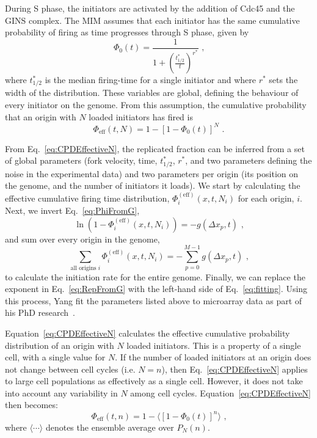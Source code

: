 {		During S phase, the initiators are activated by the addition of Cdc45 and the GINS complex.
		The MIM assumes that each initiator has the same cumulative probability of firing as time progresses through S phase, given by
		\begin{equation}\label{eq:CPDInitiator}
			\Phi_0(t) = \frac{1}{1+\left(\frac{t^*_{1/2}}{t}\right)^{r^*}}\text{ ,}
		\end{equation}
		where $t^*_{1/2}$ is the median firing-time for a single initiator and where $r^*$ sets the width of the distribution.
		These variables are global, defining the behaviour of every initiator on the genome.
		From this assumption, the cumulative probability that an origin with $N$ loaded initiators has fired is
		\begin{equation} \label{eq:CPDEffectiveN}
			\Phi_{\text{eff}}(t,N) = 1 - \left[1 - \Phi_0(t)\right]^N\text{ .}
		\end{equation}
		
		From Eq.~\ref{eq:CPDEffectiveN}, the replicated fraction can be inferred from a set of global parameters (fork velocity, time, $t^*_{1/2}$, $r^*$, and two parameters defining the noise in the experimental data) and two parameters per origin (its position on the genome, and the number of initiators it loads).
		We start by calculating the effective cumulative firing time distribution, $\Phi_{i}^{(\text{eff})}(x,t,N_i)$ for each origin, $i$.
		Next, we invert Eq.~\ref{eq:PhiFromG},
		\begin{equation}
			\ln \left( 1- \Phi_{i}^{(\text{eff})}(x,t,N_i)\right) = - g(\Delta x_p, t) \text{ ,}
		\end{equation}
		and sum over every origin in the genome,
		\begin{equation} \label{eq:fitting}
			\sum\limits_{\text{all origins }i}\Phi_{i}^{(\text{eff})}(x,t,N_i) = - \sum\limits_{p=0}^{M-1} g(\Delta x_p,t) \text{ ,}
		\end{equation}
		to calculate the initiation rate for the entire genome.
		Finally, we can replace the exponent in Eq.~\ref{eq:RepFromG} with the left-hand side of Eq.~\ref{eq:fitting}.
		Using this process, Yang fit the parameters listed above to microarray data as part of his PhD research~\cite{ScottsThesis}.
	
		Equation~\ref{eq:CPDEffectiveN} calculates the effective cumulative probability distribution of an origin with $N$ loaded initiators.
		This is a property of a single cell, with a single value for $N$.
		If the number of loaded initiators at an origin does not change between cell cycles (i.e. $N=n$), then Eq.~\ref{eq:CPDEffectiveN} applies to large cell populations as effectively as a single cell.
		However, it does not take into account any variability in $N$ among cell cycles.
		Equation~\ref{eq:CPDEffectiveN} then becomes:
		\begin{equation} \label{eq:CPDEffectiven}
			\Phi_{\text{eff}}(t,n) = 1 - \langle\left[1 - \Phi_0(t)\right]^n\rangle\text{ ,}
		\end{equation}
		where $\langle \cdots \rangle$ denotes the ensemble average over $P_N(n)$.
		
}

